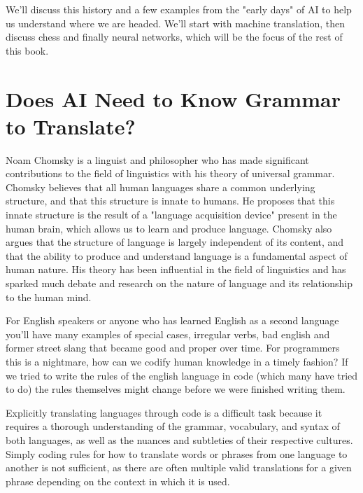 We'll discuss this history and a few examples from the "early days" of AI to help us understand where we are headed. We'll start with machine translation, then discuss chess and finally neural networks, which will be the focus of the rest of this book.

\section{Does AI Need to Know Grammar to Translate?}

Noam Chomsky is a linguist and philosopher who has made significant contributions to the field of linguistics with his theory of universal grammar. Chomsky believes that all human languages share a common underlying structure, and that this structure is innate to humans. He proposes that this innate structure is the result of a "language acquisition device" present in the human brain, which allows us to learn and produce language. Chomsky also argues that the structure of language is largely independent of its content, and that the ability to produce and understand language is a fundamental aspect of human nature. His theory has been influential in the field of linguistics and has sparked much debate and research on the nature of language and its relationship to the human mind.

For English speakers or anyone who has learned English as a second language you'll have many examples of special cases, irregular verbs, bad english and former street slang that became good and proper over time. For programmers this is a nightmare, how can we codify human knowledge in a timely fashion? If we tried to write the rules of the english language in code (which many have tried to do) the rules themselves might change before we were finished writing them.

Explicitly translating languages through code is a difficult task because it requires a thorough understanding of the grammar, vocabulary, and syntax of both languages, as well as the nuances and subtleties of their respective cultures. Simply coding rules for how to translate words or phrases from one language to another is not sufficient, as there are often multiple valid translations for a given phrase depending on the context in which it is used.


